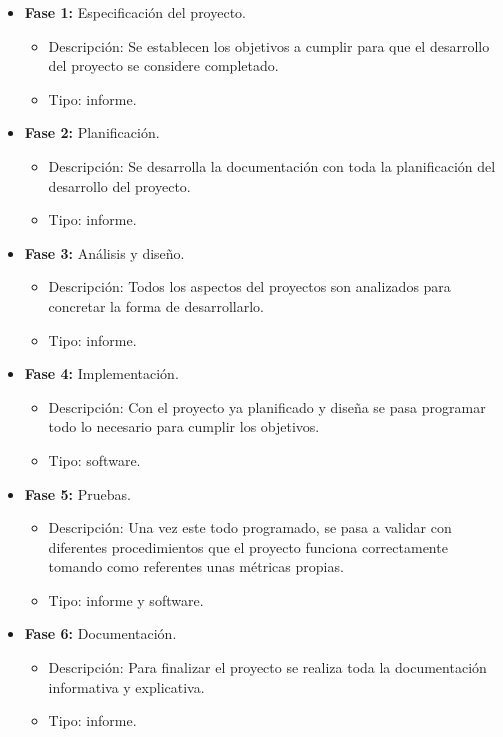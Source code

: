 \begin{itemize}
  \item \textbf{Fase 1:} Especificación del proyecto.
  \begin{itemize}
    \item Descripción: Se establecen los objetivos a cumplir para que el desarrollo del proyecto se considere completado.
    \item Tipo: informe.
  \end{itemize}
  \newpage
  \item \textbf{Fase 2:} Planificación.
  \begin{itemize}
    \item Descripción: Se desarrolla la documentación con toda la planificación del desarrollo del proyecto.
    \item Tipo: informe.
  \end{itemize}
  \item \textbf{Fase 3:} Análisis y diseño.
  \begin{itemize}
    \item Descripción: Todos los aspectos del proyectos son analizados para concretar la forma de desarrollarlo.
    \item Tipo: informe.
  \end{itemize}
  \item \textbf{Fase 4:} Implementación.
  \begin{itemize}
    \item Descripción: Con el proyecto ya planificado y diseña se pasa programar todo lo necesario para cumplir los objetivos.
    \item Tipo: software.
  \end{itemize}
  \item \textbf{Fase 5:} Pruebas.
  \begin{itemize}
    \item Descripción: Una vez este todo programado, se pasa a validar con diferentes procedimientos que el proyecto funciona
    correctamente tomando como referentes unas métricas propias.
    \item Tipo: informe y software.
  \end{itemize}
  \item \textbf{Fase 6:} Documentación.
  \begin{itemize}
    \item Descripción: Para finalizar el proyecto se realiza toda la documentación informativa y explicativa.
    \item Tipo: informe.
  \end{itemize}
\end{itemize}

